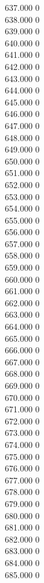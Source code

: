 { 637.000	0 \\
 638.000	0 \\
 639.000	0 \\
 640.000	0 \\
 641.000	0 \\
 642.000	0 \\
 643.000	0 \\
 644.000	0 \\
 645.000	0 \\
 646.000	0 \\
 647.000	0 \\
 648.000	0 \\
 649.000	0 \\
 650.000	0 \\
 651.000	0 \\
 652.000	0 \\
 653.000	0 \\
 654.000	0 \\
 655.000	0 \\
 656.000	0 \\
 657.000	0 \\
 658.000	0 \\
 659.000	0 \\
 660.000	0 \\
 661.000	0 \\
 662.000	0 \\
 663.000	0 \\
 664.000	0 \\
 665.000	0 \\
 666.000	0 \\
 667.000	0 \\
 668.000	0 \\
 669.000	0 \\
 670.000	0 \\
 671.000	0 \\
 672.000	0 \\
 673.000	0 \\
 674.000	0 \\
 675.000	0 \\
 676.000	0 \\
 677.000	0 \\
 678.000	0 \\
 679.000	0 \\
 680.000	0 \\
 681.000	0 \\
 682.000	0 \\
 683.000	0 \\
 684.000	0 \\
 685.000	0 \\
}
